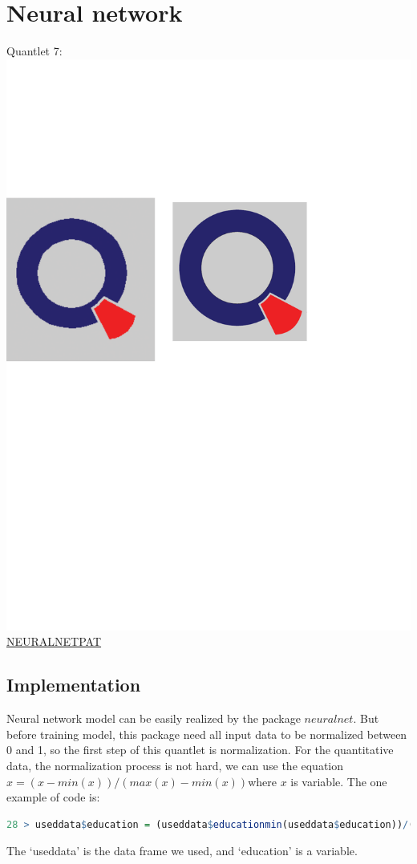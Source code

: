 \documentclass[12pt, a4paper, bibliography=totoc, english]{scrartcl}
\begin{document}
\section{Neural network}\label{QNN}
Quantlet 7:\includegraphics[scale=0.08]{qletlogo}
\textcolor{blue}{\href{https://github.com/JingyiLiu3136/MLFBM/tree/master/NEURALNETPAT}{NEURALNETPAT}}\\
\subsection{Implementation}

Neural network model can be easily realized by the package $neuralnet$. But before training model, this package need all input data to be normalized between 0 and 1, so the first step of this quantlet is normalization.
For the quantitative data, the normalization process is not hard, we can use the equation $x=(x-min(x))/(max(x)-min(x))$where $x$ is variable. The one example of code is:
\begin{lstlisting}[language = R]
28 > useddata$education = (useddata$educationmin(useddata$education))/(max(useddata$education) - min(useddata$education))
\end{lstlisting}
The `useddata' is the data frame we used, and `education' is a variable.
\end{document}
